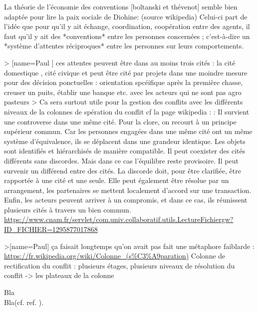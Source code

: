 La théorie de l'économie des conventions [boltanski et thévenot]  semble bien adaptée pour lire la paix sociale de Diohine: (source wikipedia) Celui-ci part de l'idée que pour qu'il y ait échange, coordination, coopération entre des agents, il faut qu'il y ait des *conventions* entre les personnes concernées ; c’est-à-dire un *système d'attentes réciproques* entre les personnes sur leurs comportements.

> [name=Paul ] ces attentes peuvent être dans au moins trois cités : la cité domestique , cité civique et peut être cité par projets dans une moindre mesure pour des décision ponctuelles : orientation spcéifique après la première chasse, creuser un puits, établir une banque etc. avec les acteurs qui ne sont pas agro pasteurs 
> Ca sera surtout utile pour la gestion des conflits avec les différents niveaux de la colonnes de spération du conflit  cf la page wikipedia : :     Il survient une controverse dans une même cité. Pour la clore, on recourt à un principe supérieur commun. Car les personnes engagées dans une même cité ont un même système d'équivalence, ils se déplacent dans une grandeur identique. Les objets sont identifiés et hiérarchisés de manière compatible.
    Il peut coexister des cités différents sans discordes. Mais dans ce cas l'équilibre reste provisoire.
    Il peut survenir un différend entre des cités. La discorde doit, pour être clarifiée, être rapportée à une cité et une seule. Elle peut également être résolue par un arrangement, les partenaires se mettent localement d'accord sur une transaction. Enfin, les acteurs peuvent arriver à un compromis, et dans ce cas, ils réunissent plusieurs cités à travers un bien commun.
   \url{ https://www.cnam.fr/servlet/com.univ.collaboratif.utils.LectureFichiergw?ID_FICHIER=1295877017868}


>[name=Paul] ça faisait longtemps qu'on avait pas fait une métaphore faiblarde : \url{https://fr.wikipedia.org/wiki/Colonne_(s%C3%A9paration)} 
Colonne de rectification du conflit : plusieurs étages, plusieurs niveaux de résolution du conflit -> les plateaux de la colonne


Bla\footnotemark\\

Bla(cf. ref. \cite{cite6}).

